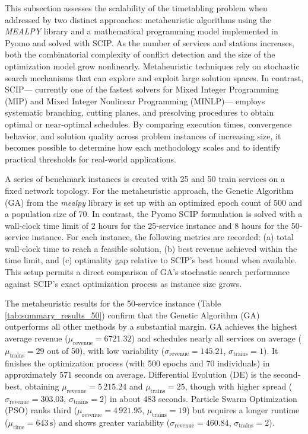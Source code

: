 \documentclass[Afour,sagev,times]{sagej}
\begin{document}
This subsection assesses the scalability of the timetabling problem when addressed by two distinct approaches: metaheuristic algorithms using the \textit{MEALPY} library and a mathematical programming model implemented in Pyomo and solved with \gls{SCIP}. As the number of services and stations increases, both the combinatorial complexity of conflict detection and the size of the optimization model grow nonlinearly. Metaheuristic techniques rely on stochastic search mechanisms that can explore and exploit large solution spaces. In contrast, SCIP— currently one of the fastest solvers for Mixed Integer Programming (MIP) and Mixed Integer Nonlinear Programming (MINLP)— employs systematic branching, cutting planes, and presolving procedures to obtain optimal or near‐optimal schedules. By comparing execution times, convergence behavior, and solution quality across problem instances of increasing size, it becomes possible to determine how each methodology scales and to identify practical thresholds for real‐world applications.

A series of benchmark instances is created with 25 and 50 train services on a fixed network topology. For the metaheuristic approach, the Genetic Algorithm (GA) from the \textit{mealpy} library is set up with an optimized epoch count of 500 and a population size of 70. In contrast, the Pyomo SCIP formulation is solved with a wall‐clock time limit of 2 hours for the 25‐service instance and 8 hours for the 50‐service instance. For each instance, the following metrics are recorded: (a) total wall‐clock time to reach a feasible solution, (b) best revenue achieved within the time limit, and (c) optimality gap relative to SCIP’s best bound when available. This setup permits a direct comparison of GA’s stochastic search performance against SCIP’s exact optimization process as instance size grows.

The metaheuristic results for the 50‐service instance (Table \ref{tab:summary_results_50}) confirm that the Genetic Algorithm (GA) outperforms all other methods by a substantial margin. GA achieves the highest average revenue (\(\mu_{\text{revenue}} = 6721.32\)) and schedules nearly all services on average (\(\mu_{\text{trains}} = 29\) out of 50), with low variability (\(\sigma_{\text{revenue}} = 145.21\), \(\sigma_{\text{trains}} = 1\)). It finishes the optimization process (with 500 epochs and 70 individuals) in approximately 571 seconds on average. Differential Evolution (DE) is the second‐best, obtaining \(\mu_{\text{revenue}} = 5\,215.24\) and \(\mu_{\text{trains}} = 25\), though with higher spread (\(\sigma_{\text{revenue}} = 303.03\), \(\sigma_{\text{trains}} = 2\)) in about 483 seconds. Particle Swarm Optimization (PSO) ranks third (\(\mu_{\text{revenue}} = 4\,921.95\), \(\mu_{\text{trains}} = 19\)) but requires a longer runtime (\(\mu_{\text{time}} = 643\,\text{s}\)) and shows greater variability (\(\sigma_{\text{revenue}} = 460.84\), \(\sigma_{\text{trains}} = 2\)).
\end{document}

